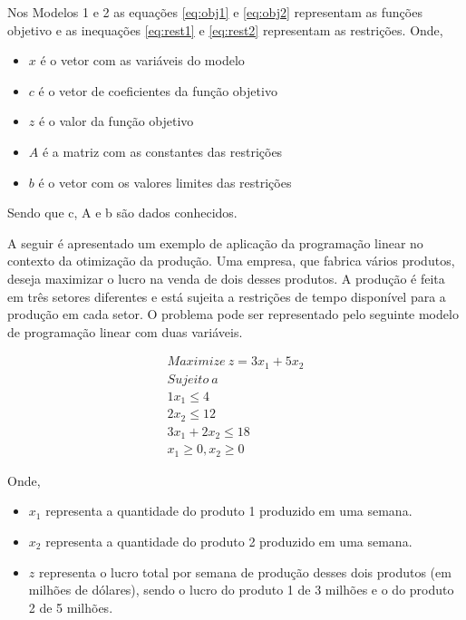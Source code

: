 Nos Modelos 1 e 2 as equações \ref{eq:obj1} e \ref{eq:obj2} representam as funções objetivo e as inequações \ref{eq:rest1} e \ref{eq:rest2} representam as restrições.
Onde, 
\begin{itemize}
\item \textbf {$x$} é o vetor com as variáveis do modelo
\item \textbf {$c$} é o vetor de coeficientes da função objetivo
\item \textbf {$z$} é o valor da função objetivo
\item \textbf {$A$} é a matriz com as constantes das restrições
\item \textbf {$b$} é o vetor com os valores limites das restrições
\end{itemize}

Sendo que c, A e b são dados conhecidos.

A seguir é apresentado um exemplo de aplicação da programação linear no contexto da otimização da produção. Uma empresa, que fabrica vários produtos, deseja maximizar o lucro na venda de dois desses produtos.
A produção é feita em três setores diferentes e está sujeita a restrições de tempo disponível para a produção em cada setor.
O problema pode ser representado pelo seguinte modelo de programação linear com duas variáveis\cite{Hillier}.

\begin{eqnarray}
Maximize\ z=3x_{1}+5x_{2}\label{eq2:eq1}\\ 
Sujeito\ a \nonumber \\ 
1x_{1}\leq 4 \label{eq2:eq2} \\  
2x_{2}\leq 12 \label{eq2:eq3} \\ 
3x_{1}+2x_{2}\leq 18 \label{eq2:eq4}\\ 
x_{1}\geq 0, x_{2}\geq 0 \label{eq2:eq5}
\end{eqnarray}

Onde, 
\begin{itemize}
\item \textbf {$x_{1}$} representa a quantidade do produto 1 produzido em uma semana.
\item \textbf {$x_{2}$} representa a quantidade do produto 2 produzido em uma semana.
\item \textbf {$z$} representa o lucro total por semana de produção desses dois produtos (em milhões de dólares), sendo o lucro do produto 1 de 3 milhões e o do produto 2 de 5 milhões.
\end{itemize}

